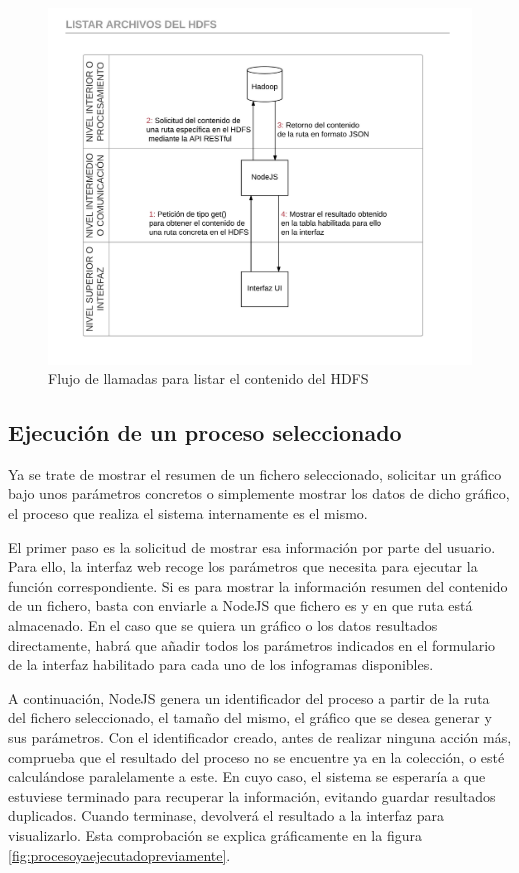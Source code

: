 \begin{figure}
	\centering
	\includegraphics[width=1\linewidth]{imagenes/Listar_archivos_del_HDFS}
	\caption{Flujo de llamadas para listar el contenido del HDFS}
	\label{fig:listararchivosdelhdfs}
\end{figure}

\subsection{Ejecución de un proceso seleccionado}

Ya se trate de mostrar el resumen de un fichero seleccionado, solicitar un gráfico bajo unos parámetros concretos o simplemente mostrar los datos de dicho gráfico, el proceso que realiza el sistema internamente es el mismo. 

El primer paso es la solicitud de mostrar esa información por parte del usuario. Para ello, la interfaz web recoge los parámetros que necesita para ejecutar la función correspondiente. Si es para mostrar la información resumen del contenido de un fichero, basta con enviarle a NodeJS que fichero es y en que ruta está almacenado. En el caso que se quiera un gráfico o los datos resultados directamente, habrá que añadir todos los parámetros indicados en el formulario de la interfaz habilitado para cada uno de los infogramas disponibles. 

A continuación, NodeJS genera un identificador del proceso a partir de la ruta del fichero seleccionado, el tamaño del mismo, el gráfico que se desea generar y sus parámetros. Con el identificador creado, antes de realizar ninguna acción más, comprueba que el resultado del proceso no se encuentre ya en la colección, o esté calculándose paralelamente a este. En cuyo caso, el sistema se esperaría a que estuviese terminado para recuperar la información, evitando guardar resultados duplicados. Cuando terminase, devolverá el resultado a la interfaz para visualizarlo. Esta comprobación se explica gráficamente en la figura \ref{fig:procesoyaejecutadopreviamente}.


